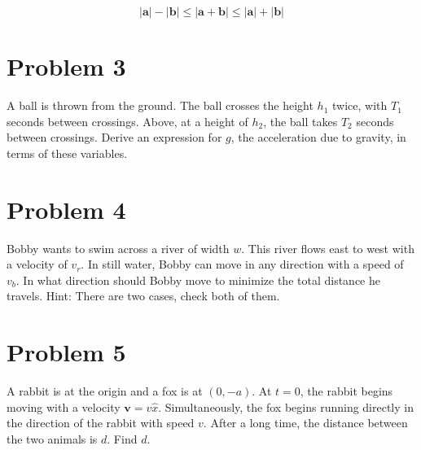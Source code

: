 \documentclass[11pt]{scrartcl}
\begin{document}
$$
|\bm{a}| - |\bm{b}| \leq |\bm{a}+\bm{b}| \leq |\bm{a}|+ |\bm{b}|
$$

\section{Problem 3}
A ball is thrown from the ground.
The ball crosses the height $h_1$ twice, with $T_1$ seconds between crossings.
Above, at a height of $h_2$, the ball takes $T_2$ seconds between crossings.
Derive an expression for $g$, the acceleration due to gravity, in terms of these variables.

\section{Problem 4}
Bobby wants to swim across a river of width $w$.
This river flows east to west with a velocity of $v_r$.
In still water, Bobby can move in any direction with a speed of $v_b$.
In what direction should Bobby move to minimize the total distance he travels.
Hint: There are two cases, check both of them.

\section{Problem 5}
A rabbit is at the origin and a fox is at $(0, -a)$.
At $t=0$, the rabbit begins moving with a velocity $\bm{v} = v \hat{x}$.
Simultaneously, the fox begins running directly in the direction of the rabbit with speed $v$.
After a long time, the distance between the two animals is $d$.
Find $d$.
\end{document}

